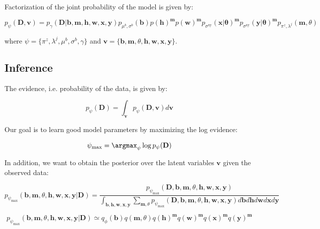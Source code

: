 Factorization of the joint probability of the model is given by:

\begin{equation}
    p_\psi (\mathbf{D}, \mathbf{v})
    = p_\gamma (\mathbf{D} | \mathbf{b}, \mathbf{m}, \mathbf{h}, \mathbf{w}, \mathbf{x}, \mathbf{y})
    p_{\mu^b, \sigma^b} (\mathbf{b})
    p (\mathbf{h})^\mathbf{m}
    p (\mathbf{w})^\mathbf{m}
    p_{\sigma^{\mathrm{xy}}} (\mathbf{x}|\mathbf{\theta})^\mathbf{m}
    p_{\sigma^{\mathrm{xy}}} (\mathbf{y}|\mathbf{\theta})^\mathbf{m}
    p_{\pi^z, \lambda^j} (\mathbf{m}, \theta)
\end{equation} 

where $\psi = \{ \pi^z, \lambda^j, \mu^b, \sigma^b, \gamma \}$ and $\mathbf{v} = \{ \mathbf{b}, \mathbf{m}, \theta, \mathbf{h}, \mathbf{w}, \mathbf{x}, \mathbf{y} \}$.

\subsection{Inference}

The evidence, i.e. probability of the data, is given by:

\begin{equation}
    p_\psi (\mathbf{D}) = \int_\mathbf{v} p_\psi (\mathbf{D}, \mathbf{v}) d\mathbf{v}
\end{equation}

Our goal is to learn good model parameters by maximizing the log evidence:

\begin{equation}
    \psi_{\max} = \argmax_\psi \log p_\psi (\mathbf{D})
\end{equation}

In addition, we want to obtain the posterior over the latent variables $\mathbf{v}$ given the observed data:

\begin{equation}
    p_{\psi_{\max}} (\mathbf{b}, \mathbf{m}, \theta, \mathbf{h}, \mathbf{w}, \mathbf{x}, \mathbf{y}|\mathbf{D}) =
    \dfrac{p_{\psi_{\max}}(\mathbf{D}, \mathbf{b}, \mathbf{m}, \theta, \mathbf{h}, \mathbf{w}, \mathbf{x}, \mathbf{y})}
    {\int_{\mathbf{b}, \mathbf{h}, \mathbf{w}, \mathbf{x}, \mathbf{y}}
    \sum_{\mathbf{m}, \theta}
    p_{\psi_{\max}} (\mathbf{D}, \mathbf{b}, \mathbf{m}, \theta, \mathbf{h}, \mathbf{w}, \mathbf{x}, \mathbf{y})
    d\mathbf{b} d\mathbf{h} d\mathbf{w} d\mathbf{x} d\mathbf{y}}
\end{equation}

\begin{equation}
    p_{\psi_{\max}}(\mathbf{b}, \mathbf{m}, \theta, \mathbf{h}, \mathbf{w}, \mathbf{x}, \mathbf{y}|\mathbf{D})
    \simeq q_{\phi}(\mathbf{b}) q(\mathbf{m}, \theta) q(\mathbf{h})^\mathbf{m}
    q(\mathbf{w})^\mathbf{m} q(\mathbf{x})^\mathbf{m} q(\mathbf{y})^\mathbf{m}
\end{equation}

